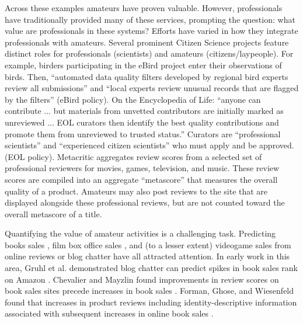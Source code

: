 \documentclass[letterpaper]{article}
\begin{document}
Across these examples amateurs have proven valuable. 
However, professionals have traditionally provided many of these services, prompting the question: what value are professionals in these systems?
Efforts have varied in how they integrate professionals with amateurs.
Several prominent Citizen Science projects feature distinct roles for professionals (scientists) and amateurs (citizens/laypeople). For example, birders participating in the eBird project enter their observations of birds. Then, ``automated data quality filters developed by regional bird experts review all submissions'' and ``local experts review unusual records that are flagged by the filters'' (eBird policy).
On the Encyclopedia of Life: ``anyone can contribute ... but materials from unvetted contributors are initially marked as unreviewed ... EOL curators then identify the best quality contributions and promote them from unreviewed to trusted status.'' Curators are ``professional scientists'' and ``experienced citizen scientists'' who must apply and be approved. (EOL policy).
Metacritic aggregates review scores from a selected set of professional reviewers for movies, games, television, and music. These review scores are compiled into an aggregate ``metascore'' that measures the overall quality of a product. Amateurs may also post reviews to the site that are displayed alongside these professional reviews, but are not counted toward the overall metascore of a title.

Quantifying the value of amateur activities is a challenging task. 
Predicting books sales \cite{gruhl2005predictive,chevalier2003effect}, film box office sales \cite{dellarocas2007exploring,yu2012mining}, and (to a lesser extent) videogame sales \cite{ehrenfeld2011predicting,marcoux2009hybrid} from online reviews or blog chatter have all attracted attention. In early work in this area, Gruhl et al. demonstrated blog chatter can predict spikes in book sales rank on Amazon \cite{gruhl2005predictive}. Chevalier and Mayzlin found improvements in review scores on book sales sites precede increases in book sales \cite{chevalier2003effect}. Forman, Ghose, and Wiesenfeld found that increases in product reviews including identity-descriptive information associated with subsequent increases in online book sales \cite{ghose2007designing}.
\end{document}
